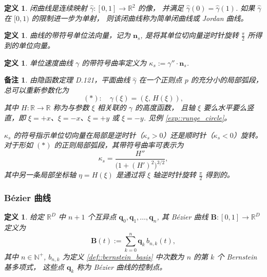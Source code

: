 \documentclass[a4paper]{ctexart}
\newtheorem{remark}{备注}
\newtheorem{definition}[theorem]{定义} %
\numberwithin{theorem}{section}
\numberwithin{equation}{section}
\numberwithin{figure}{section}
\numberwithin{remark}{section}
\begin{document}
\begin{definition}
闭曲线是连续映射 $\hat\gamma:[0,1]\to\mathbb{R}^2$ 的像，
并满足 $\hat\gamma(0)=\hat\gamma(1)$. 如果 $\hat\gamma$ 在 $[0,1)$ 的限制进一步为单射，
则该闭曲线称为简单闭曲线或 Jordan 曲线。
\end{definition}

\begin{definition}
曲线的带符号单位法向量，记为 $\mathbf{n}_s$, 是将其单位切向量逆时针旋转 $\tfrac{\pi}{2}$ 所得到的单位向量。
\end{definition}

\begin{definition}
单位速度曲线 $\gamma$ 的带符号曲率定义为 $\kappa_s := \gamma''\cdot \mathbf{n}_s$.
\end{definition}

\begin{remark}
由隐函数定理 D.121，平面曲线 $\hat\gamma$ 在一个正则点 $p$ 的充分小的局部弧段，总可以重新参数化为
\begin{equation*}
(\ast):\quad \gamma(\xi)=(\xi,\,H(\xi)),
\end{equation*}
其中 $H:\mathbb{R}\to\mathbb{R}$ 称为与参数 $\xi$ 相关联的 $\gamma$ 的高度函数，
且轴 $\xi$ 要么水平要么竖直，即 $\xi=+x$、$\xi=-x$、$\xi=+y$ 或 $\xi=-y$. 见例 \ref{exp::runge_circle}。

$\kappa_s$ 的符号指示单位切向量在局部是逆时针（$\kappa_s>0$）还是顺时针（$\kappa_s<0$）旋转。
对于形如 $(\ast)$ 的正则局部弧段，其带符号曲率可表示为
\begin{equation*}
\kappa_s=\frac{H''}{\bigl(1+(H')^{2}\bigr)^{3/2}},
\end{equation*}
其中另一条局部坐标轴 $\eta=H(\xi)$ 是通过将 $\xi$ 轴逆时针旋转 $\tfrac{\pi}{2}$ 得到的。
\end{remark}


\subsubsection{Bézier 曲线}

\begin{definition}
    \label{def::bezier_curve}
给定 $\mathbb{R}^D$ 中 $n+1$ 个互异点 $\mathbf{q}_0,\mathbf{q}_1,\ldots,\mathbf{q}_n$, 
其 Bézier 曲线 $\mathbf{B}:[0,1]\to\mathbb{R}^D$ 定义为
\begin{equation}
    \label{eq::bezier_curve}
\mathbf{B}(t):=\sum_{k=0}^{n}\mathbf{q}_k\, b_{n,k}(t),
\end{equation}
其中 $n\in\mathbb{N}^+$, $b_{n,k}$ 为定义 \ref{def::bernstein_basis} 中次数为 $n$ 的第 $k$ 个 Bernstein 基多项式，
这些点 $\mathbf{q}_k$ 称为 Bézier 曲线的控制点。
\end{definition}
\end{document}

